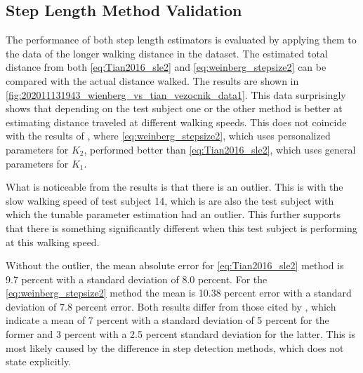 \subsection{Step Length Method Validation}

The performance of both step length estimators is evaluated by applying them to the data of the longer walking distance in the \citet{Vezocnik2019} dataset. The estimated total distance from both \eqref{eq:Tian2016_sle2} and \eqref{eq:weinberg_stepsize2} can be compared with the actual distance walked. The results are shown in  \cref{fig:202011131943_wienberg_vs_tian_vezocnik_data1}. This data surprisingly shows that depending on the test subject one or the other method is better at estimating distance traveled at different walking speeds. This does not coincide with the results of \cite{Vezocnik2019}, where \eqref{eq:weinberg_stepsize2}, which uses personalized parameters for $ K_2 $, performed better than \eqref{eq:Tian2016_sle2}, which uses general parameters for $ K_1 $. \par 

What is noticeable from the results is that there is an outlier. This is with the slow walking speed of test subject 14, which is are also the test subject with which the tunable parameter estimation had an outlier. This further supports that there is something significantly different when this test subject is performing at this walking speed.\par 

 Without the outlier, the mean absolute error for \eqref{eq:Tian2016_sle2} method is 9.7 percent with a standard deviation of 8.0 percent. For the \eqref{eq:weinberg_stepsize2} method the mean is 10.38 percent error with a standard deviation of 7.8 percent error. Both results differ from those cited by \cite{Vezocnik2019}, which indicate a mean of 7 percent with a standard deviation of 5 percent for the former and 3 percent with a 2.5 percent standard deviation for the latter.
 This is most likely caused by the difference in step detection methods, which \cite{Vezocnik2019} does not state explicitly.
 
\par

